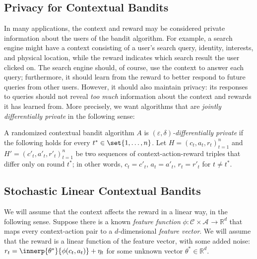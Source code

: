 \documentclass{article}
\newcommand{\Real}{\mathds{R}}
\newcommand{\Aset}[1]{\mathcal{A}_{#1}}
\newcommand{\Cset}[1]{\mathcal{C}_{#1}}
\begin{document}
\subsection{Privacy for Contextual Bandits}

In many applications, the context and reward may be considered private
information about the users of the bandit algorithm.  For example, a
search engine might have a context consisting of a user's search
query, identity, interests, and physical location, while the reward
indicates which search result the user clicked on.  The search engine
should, of course, use the context to answer each query; furthermore,
it should learn from the reward to better respond to future queries
from other users.  However, it should also maintain privacy: its
responses to queries should not reveal \emph{too much} information
about the context and rewards it has learned from.  More precisely, we
want algorithms that are \emph{jointly differentially private} in the
following sense:

\begin{definition}
  A randomized contextual bandit algorithm $A$ is
  \emph{$(\varepsilon,\delta)$-differentially private} if the
  following holds for every $t^*\in\set{1,\dotsc,n}$.  Let
  $H = (c_t,a_t,r_t)_{t=1}^n$ and $H' = (c'_t,a'_t,r'_t)_{t=1}^n$ be
  two sequences of context-action-reward triples that differ only on
  round $t^*$; in other words, $c_t=c'_t$, $a_t=a'_t$, $r_t=r'_t$ for
  $t\neq t^*$.  
\end{definition}

\subsection{Stochastic Linear Contextual Bandits}

We will assume that the context affects the reward in a linear way, in
the following sense.  Suppose there is a known \emph{feature function}
$\phi:\Cset{}\times\Aset{}\to\Real^d$ that maps every context-action
pair to a $d$-dimensional \emph{feature vector}.  We will assume that
the reward is a linear function of the feature vector, with some added
noise: $r_t = \innerp{\theta^*}{\phi(c_t,a_t)} + \eta_t$ for some
unknown vector $\theta^*\in\Real^d$.
\end{document}
